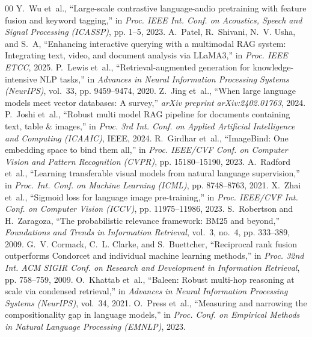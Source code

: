\documentclass[conference]{IEEEtran}
\begin{document}
\begin{thebibliography}{00}
\small
\setlength{\itemsep}{1pt plus 0.5pt minus 0.5pt}
\setlength{\parskip}{0pt}
Y.~Wu et~al., ``Large-scale contrastive language-audio pretraining with feature fusion and keyword tagging,'' in \emph{Proc. IEEE Int. Conf. on Acoustics, Speech and Signal Processing (ICASSP)}, pp. 1--5, 2023.
A.~Patel, R.~Shivani, N.~V. Usha, and S.~A, ``Enhancing interactive querying with a multimodal RAG system: Integrating text, video, and document analysis via LLaMA3,'' in \emph{Proc. IEEE ETCC}, 2025.
P.~Lewis et~al., ``Retrieval-augmented generation for knowledge-intensive NLP tasks,'' in \emph{Advances in Neural Information Processing Systems (NeurIPS)}, vol.~33, pp. 9459--9474, 2020.
Z.~Jing et~al., ``When large language models meet vector databases: A survey,'' \emph{arXiv preprint arXiv:2402.01763}, 2024.
P.~Joshi et~al., ``Robust multi model RAG pipeline for documents containing text, table \& images,'' in \emph{Proc. 3rd Int. Conf. on Applied Artificial Intelligence and Computing (ICAAIC)}, IEEE, 2024.
R.~Girdhar et~al., ``ImageBind: One embedding space to bind them all,'' in \emph{Proc. IEEE/CVF Conf. on Computer Vision and Pattern Recognition (CVPR)}, pp. 15180--15190, 2023.
A.~Radford et~al., ``Learning transferable visual models from natural language supervision,'' in \emph{Proc. Int. Conf. on Machine Learning (ICML)}, pp. 8748--8763, 2021.
X.~Zhai et~al., ``Sigmoid loss for language image pre-training,'' in \emph{Proc. IEEE/CVF Int. Conf. on Computer Vision (ICCV)}, pp. 11975--11986, 2023.
S.~Robertson and H.~Zaragoza, ``The probabilistic relevance framework: BM25 and beyond,'' \emph{Foundations and Trends in Information Retrieval}, vol.~3, no.~4, pp. 333--389, 2009.
G.~V. Cormack, C.~L. Clarke, and S.~Buettcher, ``Reciprocal rank fusion outperforms Condorcet and individual machine learning methods,'' in \emph{Proc. 32nd Int. ACM SIGIR Conf. on Research and Development in Information Retrieval}, pp. 758--759, 2009.
O.~Khattab et~al., ``Baleen: Robust multi-hop reasoning at scale via condensed retrieval,'' in \emph{Advances in Neural Information Processing Systems (NeurIPS)}, vol.~34, 2021.
O.~Press et~al., ``Measuring and narrowing the compositionality gap in language models,'' in \emph{Proc. Conf. on Empirical Methods in Natural Language Processing (EMNLP)}, 2023.

\end{thebibliography}
\end{document}
